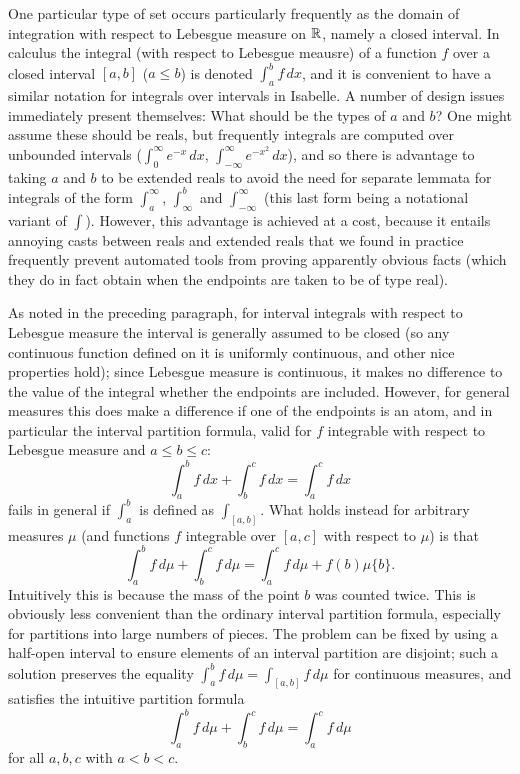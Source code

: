 \documentclass{article}
\theoremstyle{definition}
\begin{document}
One particular type of set occurs particularly frequently as the domain of integration with respect to Lebesgue measure on $\mathbb{R}$, namely a closed interval. In calculus the integral (with respect to Lebesgue meausre) of a function $f$ over a closed interval $[a,b]$ ($a \le b$) is denoted $\int_a^b f \, dx$, and it is convenient to have a similar notation for integrals over intervals in Isabelle. A number of design issues immediately present themselves: What should be the types of $a$ and $b$? One might assume these should be reals, but frequently integrals are computed over unbounded intervals ($\int_0^\infty e^{-x} \, dx$, $\int_{-\infty}^\infty e^{-x^2} \, dx$), and so there is advantage to taking $a$ and $b$ to be extended reals to avoid the need for separate lemmata for integrals of the form $\int_a^\infty$, $\int_{\infty}^b$ and $\int_{-\infty}^\infty$ (this last form being a notational variant of $\int$). However, this advantage is achieved at a cost, because it entails annoying casts between reals and extended reals that we found in practice frequently prevent automated tools from proving apparently obvious facts (which they do in fact obtain when the endpoints are taken to be of type real).

As noted in the preceding paragraph, for interval integrals with respect to Lebesgue measure the interval is generally assumed to be closed (so any continuous function defined on it is uniformly continuous, and other nice properties hold); since Lebesgue measure is continuous, it makes no difference to the value of the integral whether the endpoints are included. However, for general measures this does make a difference if one of the endpoints is an atom, and in particular the interval partition formula, valid for $f$ integrable with respect to Lebesgue measure and $a \le b \le c$:
\[ \int_a^b f \, dx + \int_b^c f \, dx = \int_a^c f \, dx \]
fails in general if $\int_a^b$ is defined as $\int_{[a,b]}$. What holds instead for arbitrary measures $\mu$ (and functions $f$ integrable over $[a,c]$ with respect to $\mu$) is that
\[ \int_a^b f \, d\mu + \int_b^c f \, d\mu = \int_a^c f \, d\mu + f(b)\mu \{b\}. \]
Intuitively this is because the mass of the point $b$ was counted twice. This is obviously less convenient than the ordinary interval partition formula, especially for partitions into large numbers of pieces. The problem can be fixed by using a half-open interval to ensure elements of an interval partition are disjoint; such a solution preserves the equality $\int_a^b f \, d\mu = \int_{[a,b]} f \, d\mu$ for continuous measures, and satisfies the intuitive partition formula
\[ \int_a^b f \, d\mu + \int_b^c f \, d\mu = \int_a^c f \, d\mu \]
for all $a,b,c$ with $a < b < c$.
\end{document}

